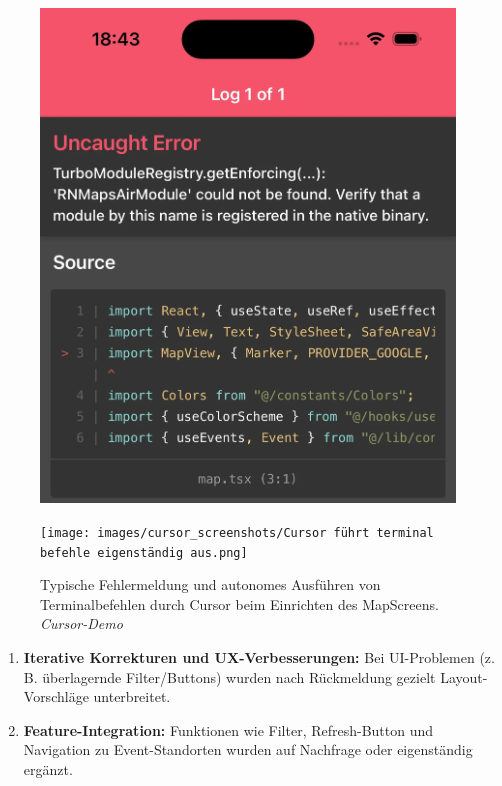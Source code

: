 \begin{figure}[htbp]
      \centering
      \begin{minipage}{0.48\textwidth}
            \centering
            \includegraphics[width=0.98\textwidth]{images/cursor_screenshots/(NOBRIDGE) ERROR-cursor.png}
      \end{minipage}
      \hfill
      \begin{minipage}{0.48\textwidth}
            \centering
            \texttt{[image: images/cursor\_screenshots/Cursor führt terminal befehle eigenständig aus.png]}
      \end{minipage}
      \caption{Typische Fehlermeldung und autonomes Ausführen von Terminalbefehlen durch Cursor beim Einrichten des MapScreens. \textit{Cursor-Demo}}
      \label{fig:cursor-error-terminal}
\end{figure}

\begin{enumerate}[resume]
      \item \textbf{Iterative Korrekturen und UX-Verbesserungen:} Bei UI-Problemen (z.\,B. überlagernde Filter/Buttons) wurden nach Rückmeldung gezielt Layout-Vorschläge unterbreitet.
      \item \textbf{Feature-Integration:} Funktionen wie Filter, Refresh-Button und Navigation zu Event-Standorten wurden auf Nachfrage oder eigenständig ergänzt.
\end{enumerate}

